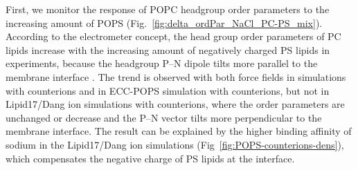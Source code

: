 \documentclass[journal=jpcbfk,manuscript=article]{achemso}
\begin{document}
First, we monitor the response of POPC headgroup order parameters to the increasing amount of POPS (Fig.~\ref{fig:delta_ordPar_NaCl_PC-PS_mix}).
According to the electrometer concept, the head group order parameters of PC lipids increase
with the increasing amount of negatively charged PS lipids in experiments, because the headgroup P--N dipole
tilts more parallel to the membrane interface \cite{seelig87,scherer87}.
The trend is observed with both force fields in simulations with  counterions and
in ECC-POPS simulation with  counterions, but not in Lipid17/Dang ion simulations with  counterions,
where the order parameters are unchanged or decrease and the P--N vector tilts more perpendicular to the membrane interface.
The result can be explained by the higher binding affinity of sodium in the
Lipid17/Dang ion simulations (Fig~\ref{fig:POPS-counterions-dens}), which
compensates the negative charge of PS lipids at the interface.
\end{document}
